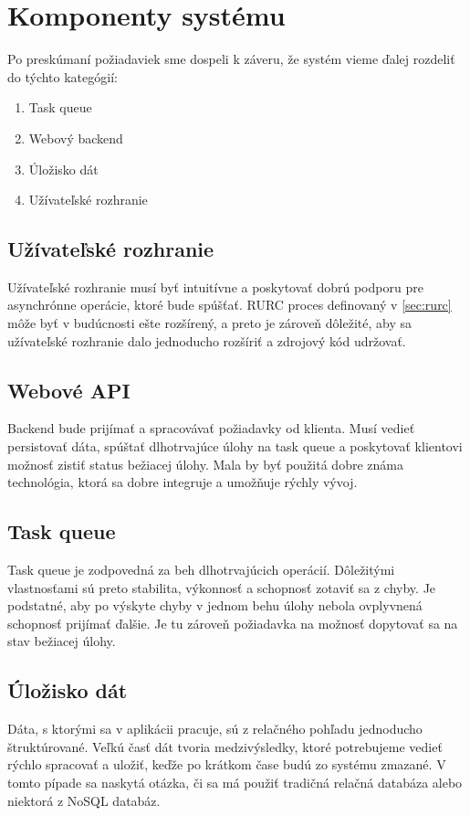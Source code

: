\section{Komponenty systému}
Po preskúmaní požiadaviek sme dospeli k záveru, že systém vieme ďalej rozdeliť do týchto kategógií:

\begin{enumerate}
  \item Task queue
  \item Webový backend
  \item Úložisko dát
  \item Užívateľské rozhranie
\end{enumerate}

\subsection{Užívateľské rozhranie}
Užívateľské rozhranie musí byť intuitívne a poskytovať dobrú podporu pre asynchrónne operácie, ktoré bude spúšťať. RURC proces definovaný v \ref{sec:rurc} môže byť v budúcnosti ešte rozšírený, a preto je zároveň dôležité, aby sa užívateľské rozhranie dalo jednoducho rozšíriť a zdrojový kód udržovať.

\subsection{Webové API}
Backend bude prijímať a spracovávať požiadavky od klienta. Musí vedieť persistovať dáta, spúštať dlhotrvajúce úlohy na task queue a poskytovať klientovi možnosť zistiť status bežiacej úlohy. Mala by byť použitá dobre známa technológia, ktorá sa dobre integruje a umožňuje rýchly vývoj.

\subsection{Task queue}
Task queue je zodpovedná za beh dlhotrvajúcich operácií. Dôležitými vlastnosťami sú preto stabilita, výkonnosť a schopnosť zotaviť sa z chyby. Je podstatné, aby po výskyte chyby v jednom behu úlohy nebola ovplyvnená schopnosť prijímať ďalšie. Je tu zároveň požiadavka na možnosť dopytovať sa na stav bežiacej úlohy.

\subsection{Úložisko dát}
Dáta, s ktorými sa v aplikácii pracuje, sú z relačného pohľadu jednoducho štruktúrované. Veľkú časť dát tvoria medzivýsledky, ktoré potrebujeme vedieť rýchlo spracovať a uložiť, keďže po krátkom čase budú zo systému zmazané. V tomto pípade sa naskytá otázka, či sa má použiť tradičná relačná databáza alebo niektorá z NoSQL databáz. 


